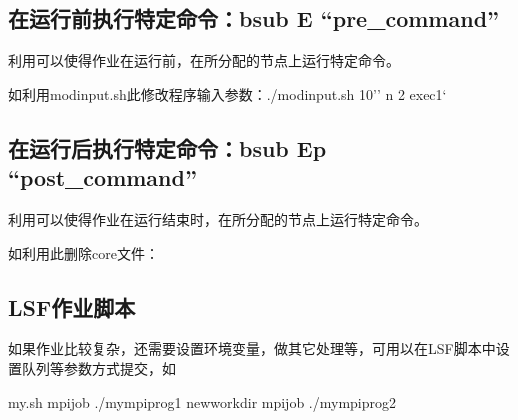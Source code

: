 \documentclass[a4paper,12pt,english]{sphinxmanual}
\begin{document}
\sphinxAtStartPar
{}


\subsection{在运行前执行特定命令：bsub \sphinxhyphen{}E “pre\_command”}
\label{\detokenize{lsf/lsf:bsub-e-pre-command}}
\sphinxAtStartPar
利用可以使得作业在运行前，在所分配的节点上运行特定命令。

\sphinxAtStartPar
如利用modinput.sh此修改程序输入参数：./modinput.sh 10’’ \sphinxhyphen{}n 2 exec1`


\subsection{在运行后执行特定命令：bsub \sphinxhyphen{}Ep “post\_command”}
\label{\detokenize{lsf/lsf:bsub-ep-post-command}}
\sphinxAtStartPar
利用可以使得作业在运行结束时，在所分配的节点上运行特定命令。

\sphinxAtStartPar
如利用此删除core文件：


\subsection{LSF作业脚本}
\label{\detokenize{lsf/lsf:id3}}
\sphinxAtStartPar
如果作业比较复杂，还需要设置环境变量，做其它处理等，可用以在LSF脚本中设置队列等参数方式提交，如

\begin{sphinxVerbatim}[commandchars=\\\{\}]
 my.sh
mpijob ./mympi\PYGZhy{}prog1
 newworkdir
mpijob ./mympi\PYGZhy{}prog2
\end{sphinxVerbatim}
\end{document}
